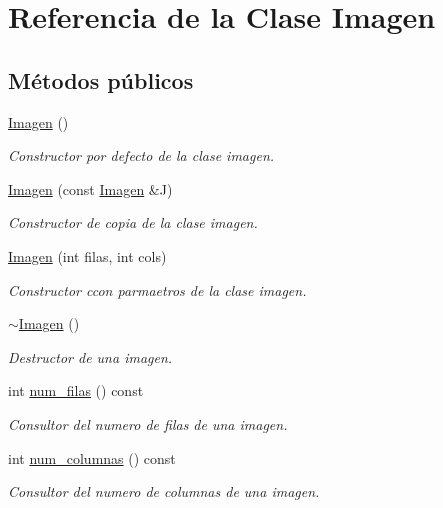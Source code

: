 \hypertarget{classImagen}{}\section{Referencia de la Clase Imagen}
\label{classImagen}
\subsection*{Métodos públicos}
\begin{DoxyCompactItemize}
\item 
\mbox{\label{classImagen_ab2e649aa7a105155c7bfdb846abf0528}} 
\hyperlink{classImagen_ab2e649aa7a105155c7bfdb846abf0528}{Imagen} ()
\begin{DoxyCompactList}\small\item\em Constructor por defecto de la clase imagen. \end{DoxyCompactList}\item 
\hyperlink{classImagen_a70437d2848ae5b030ee17cf79651a8b5}{Imagen} (const \hyperlink{classImagen}{Imagen} \&J)
\begin{DoxyCompactList}\small\item\em Constructor de copia de la clase imagen. \end{DoxyCompactList}\item 
\hyperlink{classImagen_ad4943ff0e2de31d4c25a879030f3ebf2}{Imagen} (int filas, int cols)
\begin{DoxyCompactList}\small\item\em Constructor ccon parmaetros de la clase imagen. \end{DoxyCompactList}\item 
\hyperlink{classImagen_a03dd93c9cf920a9dc0b72f8bd34f2e8a}{$\sim$\+Imagen} ()
\begin{DoxyCompactList}\small\item\em Destructor de una imagen. \end{DoxyCompactList}\item 
int \hyperlink{classImagen_a4cb4faa04f5e2913965e43a6a65acfd1}{num\+\_\+filas} () const
\begin{DoxyCompactList}\small\item\em Consultor del numero de filas de una imagen. \end{DoxyCompactList}\item 
int \hyperlink{classImagen_ac28d55c18064aea2a65e6fcf51d86191}{num\+\_\+columnas} () const
\begin{DoxyCompactList}\small\item\em Consultor del numero de columnas de una imagen. \end{DoxyCompactList}\item 

\end{DoxyCompactItemize}
